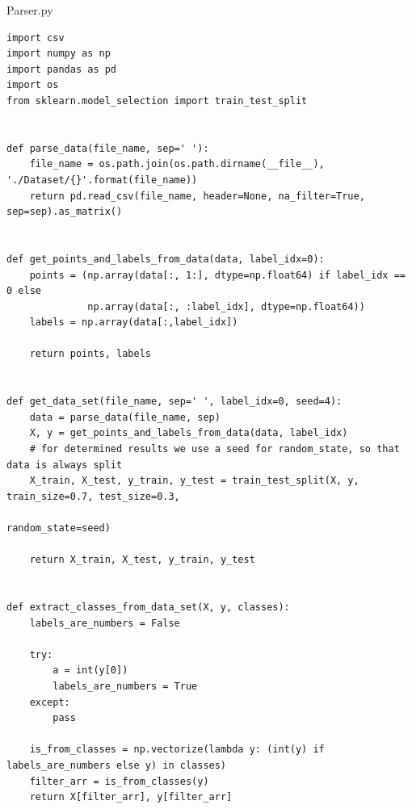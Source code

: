 Parser.py
\begin{lstlisting}[style=py]
import csv
import numpy as np
import pandas as pd
import os
from sklearn.model_selection import train_test_split


def parse_data(file_name, sep=' '):
    file_name = os.path.join(os.path.dirname(__file__), './Dataset/{}'.format(file_name))
    return pd.read_csv(file_name, header=None, na_filter=True, sep=sep).as_matrix()


def get_points_and_labels_from_data(data, label_idx=0):
    points = (np.array(data[:, 1:], dtype=np.float64) if label_idx == 0 else
              np.array(data[:, :label_idx], dtype=np.float64))
    labels = np.array(data[:,label_idx])

    return points, labels


def get_data_set(file_name, sep=' ', label_idx=0, seed=4):
    data = parse_data(file_name, sep)
    X, y = get_points_and_labels_from_data(data, label_idx)
    # for determined results we use a seed for random_state, so that data is always split
    X_train, X_test, y_train, y_test = train_test_split(X, y, train_size=0.7, test_size=0.3,
                                                        random_state=seed)

    return X_train, X_test, y_train, y_test


def extract_classes_from_data_set(X, y, classes):
    labels_are_numbers = False

    try:
        a = int(y[0])
        labels_are_numbers = True
    except:
        pass

    is_from_classes = np.vectorize(lambda y: (int(y) if labels_are_numbers else y) in classes)
    filter_arr = is_from_classes(y)
    return X[filter_arr], y[filter_arr]

\end{lstlisting}

